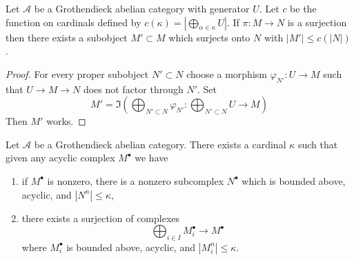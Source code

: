 \begin{lemma}
\label{lemma-surjection-bounded-size}
Let $\mathcal{A}$ be a Grothendieck abelian category with generator $U$.
Let $c$ be the function on cardinals defined by
$c(\kappa) = |\bigoplus_{\alpha \in \kappa} U|$. If $\pi : M \to N$ is a
surjection then there exists a subobject $M' \subset M$ which surjects
onto $N$ with $|M'| \leq c(|N|)$.
\end{lemma}

\begin{proof}
For every proper subobject $N' \subset N$ choose a morphism
$\varphi_{N'} : U \to M$ such that $U \to M \to N$ does not factor
through $N'$. Set
$$
M' = \Im\left(
\bigoplus\nolimits_{N' \subset N} \varphi_{N'} :
\bigoplus\nolimits_{N' \subset N} U \longrightarrow M\right)
$$
Then $M'$ works.
\end{proof}

\begin{lemma}
\label{lemma-acyclic-quotient-complexes-bounded-size}
Let $\mathcal{A}$ be a Grothendieck abelian category. There exists a cardinal
$\kappa$ such that given any acyclic complex $M^\bullet$ we have
\begin{enumerate}
\item if $M^\bullet$ is nonzero, there is a nonzero subcomplex
$N^\bullet$ which is bounded above, acyclic, and $|N^n| \leq \kappa$,
\item there exists a surjection of complexes
$$
\bigoplus\nolimits_{i \in I} M_i^\bullet \longrightarrow M^\bullet
$$
where $M_i^\bullet$ is bounded above, acyclic, and $|M_i^n| \leq \kappa$.
\end{enumerate}
\end{lemma}

